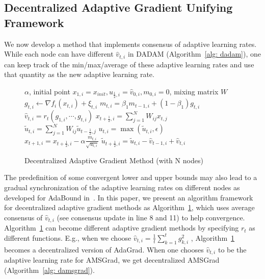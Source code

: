 \documentclass{article} %
\begin{document}
\vspace{-0.1in}

\subsection{Decentralized Adaptive Gradient Unifying Framework}

We now develop a method that implements consensus of adaptive learning rates.
While each node can have different $\hat v_{t,i}$ in DADAM (Algorithm~\ref{alg: dadam}), one can keep track of the min/max/average of these adaptive learning rates and use that quantity as the new adaptive learning rate. 

\begin{figure}
\vspace{-0.15in}
\begin{minipage}{\linewidth}
\begin{algorithm}[H]
	\caption{Decentralized Adaptive Gradient Method (with N nodes)}
	\label{alg: dadaptive}
	\begin{algorithmic}[1]
		  $\alpha$, initial point $x_{1,i} = x_{init}, u_{\frac{1}{2},i} = \hat v_{0,i}, m_{0,i}=0$, mixing matrix $W$
		\STATE  $g_{t,i}  \leftarrow \nabla f_i(x_{t,i}) + \xi_{t,i}$
		\STATE $m_{t,i} = \beta_1 m_{t-1,i} + (1-\beta_1) g_{t,i}$ 
		\STATE $\hat v_{t,i} = r_t(g_{1,i},\cdots,g_{t,i})$
		\STATE $x_{t+\frac{1}{2},i} = \sum_{j=1}^N W_{ij}x_{t,j}$
	    \STATE $\tilde u_{t,i} = \sum_{j=1}^N W_{ij} \tilde u_{t-\frac{1}{2},j}$
	    \STATE $u_{t,i} = \max(\tilde u_{t,i}, \epsilon)$
		\STATE $x_{t+1,i} = x_{t+\frac{1}{2},i} - \alpha \frac{m_{t,i}}{\sqrt{u_{t,i}}}$
		\STATE $\tilde u_{t+\frac{1}{2},i} = \tilde u_{t,i} - \hat v_{t-1,i} + \hat v_{t,i}$
		\ENDFAP
		\ENDFOR
	\end{algorithmic}
\end{algorithm}
\end{minipage}
\end{figure}
The predefinition of some convergent lower and upper bounds may also lead to a gradual synchronization of the adaptive learning rates on different nodes as developed for AdaBound in~\citet{luo2019adaptive}.
In this paper, we present an algorithm framework for decentralized adaptive gradient methods as Algorithm~\ref{alg: dadaptive}, which uses average consensus of $\hat v_{t,i}$ (see consensus update in line 8 and 11) to help convergence.  
Algorithm~\ref{alg: dadaptive} can become different adaptive gradient methods by specifying $r_t$ as different functions. E.g., when we choose $\hat v_{t,i} = {\frac{1}{t}\sum_{k=1}^t g_{k,i}^2}$ , Algorithm~\ref{alg: dadaptive} becomes a decentralized version of AdaGrad. When one chooses $\hat v_{t,i}$ to be the adaptive learning rate for AMSGrad, we get decentralized AMSGrad (Algorithm~\ref{alg: damsgrad}).
\end{document}
